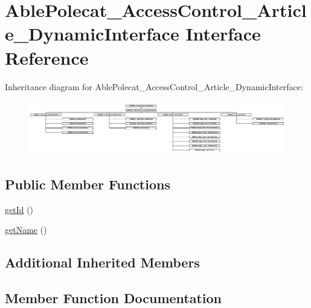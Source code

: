 \hypertarget{interface_able_polecat___access_control___article___dynamic_interface}{}\section{Able\+Polecat\+\_\+\+Access\+Control\+\_\+\+Article\+\_\+\+Dynamic\+Interface Interface Reference}
\label{interface_able_polecat___access_control___article___dynamic_interface}
Inheritance diagram for Able\+Polecat\+\_\+\+Access\+Control\+\_\+\+Article\+\_\+\+Dynamic\+Interface\+:\begin{figure}[H]
\begin{center}
\leavevmode
\includegraphics[height=2.347561cm]{interface_able_polecat___access_control___article___dynamic_interface}
\end{center}
\end{figure}
\subsection*{Public Member Functions}
\begin{DoxyCompactItemize}
\item 
\hyperlink{interface_able_polecat___access_control___article___dynamic_interface_a12251d0c022e9e21c137a105ff683f13}{get\+Id} ()
\item 
\hyperlink{interface_able_polecat___access_control___article___dynamic_interface_a3d0963e68bb313b163a73f2803c64600}{get\+Name} ()
\end{DoxyCompactItemize}
\subsection*{Additional Inherited Members}


\subsection{Member Function Documentation}
\hypertarget{interface_able_polecat___access_control___article___dynamic_interface_a12251d0c022e9e21c137a105ff683f13}{}
